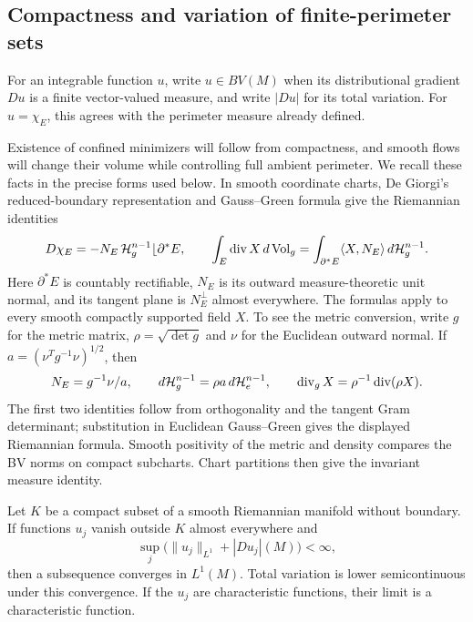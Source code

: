 \subsection{Compactness and variation of finite-perimeter sets}

For an integrable function $u$, write $u\in BV(M)$ when its
distributional gradient $Du$ is a finite vector-valued measure, and
write $|Du|$ for its total variation. For $u=\chi_E$, this agrees
with the perimeter measure already defined.

Existence of confined minimizers will follow from compactness, and smooth
flows will change their volume while controlling full ambient perimeter.
We recall these facts in the precise forms used below. In smooth coordinate charts,
De Giorgi's reduced-boundary representation and Gauss--Green formula
\cite[Synopsis, pp.~119--120]{Maggi2012} give the Riemannian identities
\[
 D\chi_E=-N_E\,\mathcal H_g^{n-1}\lfloor\partial^*E,
 \qquad
 \int_E\operatorname{div} X\,d\operatorname{Vol}_g
 =\int_{\partial^*E}\langle X,N_E\rangle\,d\mathcal H_g^{n-1}.
\]
Here $\partial^*E$ is countably rectifiable, $N_E$ is its outward
measure-theoretic unit normal, and its tangent plane is $N_E^\perp$
almost everywhere. The formulas apply to every smooth compactly
supported field $X$.
To see the metric conversion, write $g$ for the metric matrix,
$\rho=\sqrt{\det g}$ and $\nu$ for the Euclidean outward normal.
If $a=(\nu^Tg^{-1}\nu)^{1/2}$, then
\[
 N_E=g^{-1}\nu/a,\qquad
 d\mathcal H_g^{n-1}=\rho a\,d\mathcal H_e^{n-1},\qquad
 \operatorname{div}_gX=\rho^{-1}\operatorname{div}(\rho X).
\]
The first two identities follow from orthogonality and the tangent
Gram determinant; substitution in Euclidean Gauss--Green gives the
displayed Riemannian formula. Smooth positivity of the metric and
density compares the BV norms on compact subcharts. Chart partitions
then give the invariant measure identity.

\begin{lemma}\label{lem:bv-compactness}
Let $K$ be a compact subset of a smooth Riemannian manifold without
boundary. If functions $u_j$ vanish outside $K$ almost everywhere and
\[
 \sup_j\bigl(\|u_j\|_{L^1}+|Du_j|(M)\bigr)<\infty,
\]
then a subsequence converges in $L^1(M)$. Total variation is lower
semicontinuous under this convergence. If the $u_j$ are characteristic
functions, their limit is a characteristic function.
\end{lemma}

